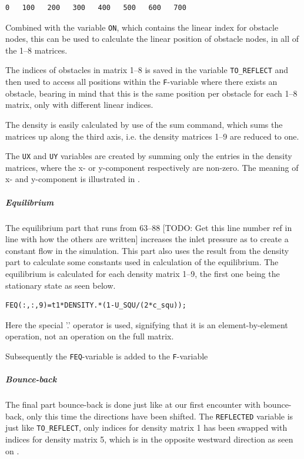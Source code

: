 \begin{verbatim}
0   100   200   300   400   500   600   700
\end{verbatim}

Combined with the variable \texttt{ON}, which contains the linear index for obstacle nodes, this can be used to calculate the linear position of obstacle nodes, in all of the 1--8 matrices.

The indices of obstacles in matrix 1--8 is saved in the variable \texttt{TO\_REFLECT} and then used to access all positions within the \texttt{F}-variable where there exists an obstacle, bearing in mind that this is the same position per obstacle for each 1--8 matrix, only with different linear indices.

The density is easily calculated by use of the sum command, which sums the matrices up along the third axis, i.e. the density matrices 1--9 are reduced to one.

The \texttt{UX} and \texttt{UY} variables are created by summing only the entries in the density matrices, where the x- or y-component respectively are non-zero. The meaning of x- and y-component is illustrated in .


\subparagraph*{Equilibrium}
The equilibrium part that runs from 63--88 [TODO: Get this line number ref in line with how the others are written] increases the inlet pressure as to create a constant flow in the simulation. This part also uses the result from the density part to calculate some constants used in calculation of the equilibrium. The equilibrium is calculated for each density matrix 1--9, the first one being the stationary state as seen below.

\begin{verbatim}
FEQ(:,:,9)=t1*DENSITY.*(1-U_SQU/(2*c_squ));
\end{verbatim}

Here the special '.' operator is used, signifying that it is an element-by-element operation, not an operation on the full matrix.

Subsequently the \texttt{FEQ}-variable is added to the \texttt{F}-variable

\subparagraph*{Bounce-back}
The final part bounce-back is done just like at our first encounter with bounce-back, only this time the directions have been shifted. The \texttt{REFLECTED} variable is just like \texttt{TO\_REFLECT}, only indices for density matrix 1 has been swapped with indices for density matrix 5, which is in the opposite westward direction as seen on .



